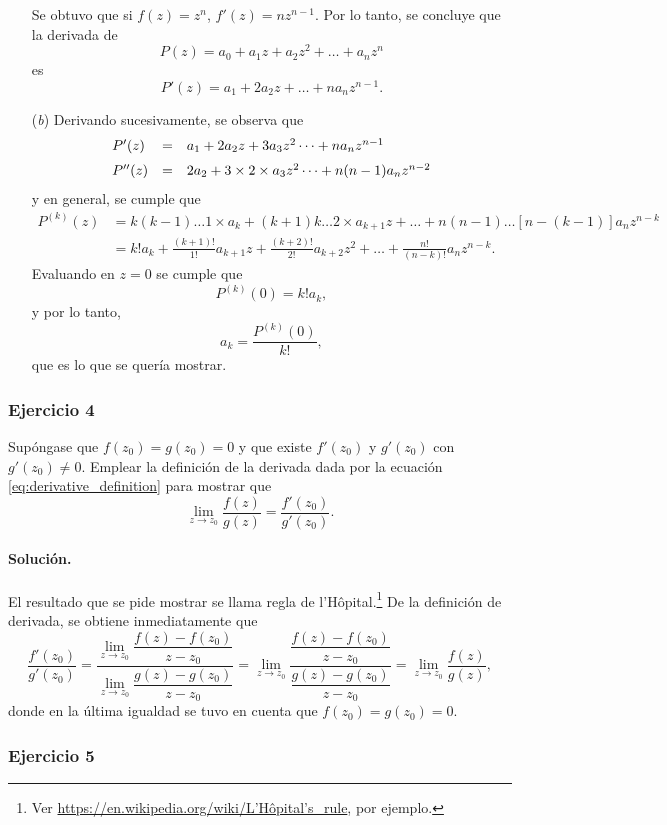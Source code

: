 \documentclass[a4paper]{report}
\begin{document}
\begin{enumerate}
Se obtuvo que si \(f(z)=z^n\), \(f'(z)=nz^{n-1}\). Por lo tanto, se concluye que la derivada de
\[
  P(z)=a_0+a_1z+a_2z^2+\dots+a_nz^n
\]
es
\[
 P'(z)=a_1+2a_2z+\dots+na_nz^{n-1}.
\]
 \item[(\textit{b})] Derivando sucesivamente, se observa que
\[
 \begin{array}{lll}
  P'(z)&=&a_1+2a_2z+3a_3z^2\dots+na_nz^{n-1}\\[\medskipamount]
  P''(z)&=&2a_2+3\times2\times a_3z^2\dots+n(n-1)a_nz^{n-2}
 \end{array}
\]
y en general, se cumple que 
\begin{align*}
 P^{(k)}(z)&=k(k-1)\dots1\times a_k+(k+1)k\dots2\times a_{k+1}z+\dots+n(n-1)\dots[n-(k-1)]a_nz^{n-k}\\
 &=k!a_k+\frac{(k+1)!}{1!}a_{k+1}z+\frac{(k+2)!}{2!}a_{k+2}z^2+\dots+\frac{n!}{(n-k)!}a_nz^{n-k}.
\end{align*}
Evaluando en \(z=0\) se cumple que 
\[
 P^{(k)}(0)=k!a_k,
\]
y por lo tanto,
\[
 a_k=\frac{P^{(k)}(0)}{k!},
\]
que es lo que se quería mostrar.
\end{enumerate}

\subsubsection{Ejercicio 4}

Supóngase que \(f(z_0)=g(z_0)=0\) y que existe \(f'(z_0)\) y \(g'(z_0)\) con \(g'(z_0)\neq0\). Emplear la definición de la derivada dada por la ecuación \ref{eq:derivative_definition} para mostrar que 
\[
 \lim_{z\to z_0}\frac{f(z)}{g(z)}=\frac{f'(z_0)}{g'(z_0)}.
\]

\paragraph{Solución.} El resultado que se pide mostrar se llama regla de l'Hôpital.\footnote{Ver \href{https://en.wikipedia.org/wiki/L\%27H\%C3\%B4pital\%27s\_rule}{https://en.wikipedia.org/wiki/L'Hôpital's\_rule}, por ejemplo.} De la definición de derivada, se obtiene inmediatamente que
\[
 \frac{f'(z_0)}{g'(z_0)}=\dfrac{\lim\limits_{z\to z_0}\dfrac{f(z)-f(z_0)}{z-z_0}}{\lim\limits_{z\to z_0}\dfrac{g(z)-g(z_0)}{z-z_0}}
 =\lim_{z\to z_0}\dfrac{\dfrac{f(z)-f(z_0)}{z-z_0}}{\dfrac{g(z)-g(z_0)}{z-z_0}}
 =\lim_{z\to z_0}\frac{f(z)}{g(z)},
\]
donde en la última igualdad se tuvo en cuenta que \(f(z_0)=g(z_0)=0\).

\subsubsection{Ejercicio 5}
\end{document}
